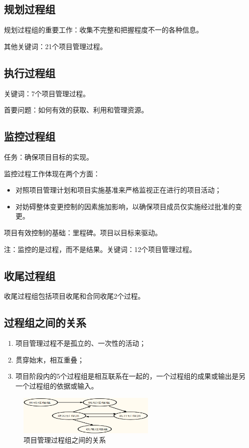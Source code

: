 \subsection{规划过程组}
规划过程组的重要工作：收集不完整和把握程度不一的各种信息。
\par 其他关键词：21个项目管理过程。
\subsection{执行过程组}
关键词：7个项目管理过程。
\par 首要问题：如何有效的获取、利用和管理资源。
\subsection{监控过程组}
任务：确保项目目标的实现。
\par 监控过程工作体现在两个方面：
\begin{itemize}
	\item 对照项目管理计划和项目实施基准来严格监视正在进行的项目活动；
	\item 对妨碍整体变更控制的因素施加影响，以确保项目成员仅实施经过批准的变更。
\end{itemize}
\par 项目有效控制的基础：里程碑。项目以目标来驱动。
\par 注：监控的是过程，而不是结果。关键词：12个项目管理过程。
\subsection{收尾过程组}
收尾过程组包括项目收尾和合同收尾2个过程。
\subsection{过程组之间的关系}
\begin{enumerate}
	\item 项目管理过程不是孤立的、一次性的活动；
	\item 贯穿始末，相互重叠；
	\item 项目阶段内的5个过程组是相互联系在一起的，一个过程组的成果或输出是另一个过程组的依据或输入。
\end{enumerate}
\begin{figure}[!h]
	\centering
	\includegraphics[width=0.6\textwidth]{image/2-6}
	\caption{项目管理过程组之间的关系 }
\end{figure}